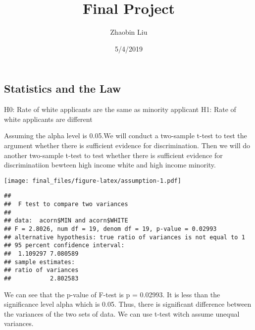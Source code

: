\documentclass[]{article}
\title{Final Project}
\author{Zhaobin Liu}
\date{5/4/2019}
\newenvironment{Shaded}{\begin{snugshade}}{\end{snugshade}}
\newcommand{\KeywordTok}[1]{\textcolor[rgb]{0.13,0.29,0.53}{\textbf{#1}}}
\newcommand{\StringTok}[1]{\textcolor[rgb]{0.31,0.60,0.02}{#1}}
\newcommand{\OperatorTok}[1]{\textcolor[rgb]{0.81,0.36,0.00}{\textbf{#1}}}
\newcommand{\NormalTok}[1]{#1}
\begin{document}
\maketitle

\subsection{Statistics and the Law}\label{statistics-and-the-law}

H0: Rate of white applicants are the same as minority applicant H1: Rate
of white applicants are different

Assuming the alpha level is 0.05.We will conduct a two-sample t-test to
test the argument whether there is sufficient evidence for
discrimination. Then we will do another two-sample t-test to test
whether there is sufficient evidence for discriminatiion bewteen high
income white and high income minority.

\begin{Shaded}
\end{Shaded}

\texttt{[image: final\_files/figure-latex/assumption-1.pdf]}

\begin{Shaded}
\end{Shaded}

\begin{verbatim}
## 
##  F test to compare two variances
## 
## data:  acorn$MIN and acorn$WHITE
## F = 2.8026, num df = 19, denom df = 19, p-value = 0.02993
## alternative hypothesis: true ratio of variances is not equal to 1
## 95 percent confidence interval:
##  1.109297 7.080589
## sample estimates:
## ratio of variances 
##           2.802583
\end{verbatim}

We can see that the p-value of F-test is p = 0.02993. It is less than
the significance level alpha which is 0.05. Thus, there is significant
difference between the variances of the two sets of data. We can use
t-test witch assume unequal variances.
\end{document}
